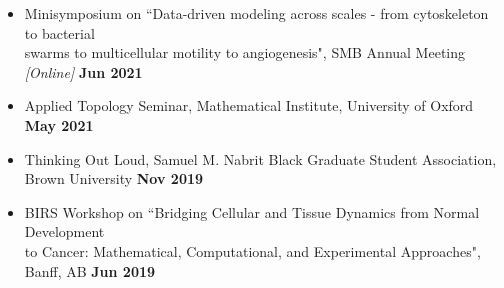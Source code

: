 \documentclass[margin,line]{res}
\begin{document}
\begin{resume}
{\begin{itemize}
\item[] Minisymposium on ``Data-driven modeling across scales - from cytoskeleton to bacterial\\ 
swarms to multicellular motility to angiogenesis", SMB Annual Meeting \textit{[Online]} \hfill {\bf \small Jun 2021}
\item[] Applied Topology Seminar, Mathematical Institute, University of Oxford \hfill {\bf \small May 2021}
\item[] Thinking Out Loud, Samuel M. Nabrit Black Graduate Student Association, \\ Brown University \hfill {\bf \small Nov 2019}
\item[] BIRS Workshop on ``Bridging Cellular and Tissue Dynamics from Normal Development\\ 
to Cancer: Mathematical, Computational, and Experimental Approaches", Banff, AB \hfill {\bf \small Jun 2019} 
\end{itemize}
}


\end{resume}
\end{document}
